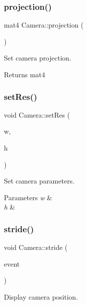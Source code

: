 \subsubsection{\texorpdfstring{projection()}{projection()}}
{\footnotesize\ttfamily mat4 Camera\+::projection (\begin{DoxyParamCaption}{ }\end{DoxyParamCaption})}



Set camera projection. 

\begin{DoxyReturn}{Returns}
mat4 
\end{DoxyReturn}
\mbox{\label{classCamera_aa14b536a20f27aff0b2041d9d5fbe56d}} 
\subsubsection{\texorpdfstring{setRes()}{setRes()}}
{\footnotesize\ttfamily void Camera\+::set\+Res (\begin{DoxyParamCaption}\item[{G\+Luint}]{w,  }\item[{G\+Luint}]{h }\end{DoxyParamCaption})}



Set camera parameters. 


\begin{DoxyParams}{Parameters}
{\em w} & \\
\hline
{\em h} & \\
\hline
\end{DoxyParams}
\mbox{\label{classCamera_a82f4dae580a39549995aa1e91394c1b8}} 
\subsubsection{\texorpdfstring{stride()}{stride()}}
{\footnotesize\ttfamily void Camera\+::stride (\begin{DoxyParamCaption}\item[{S\+D\+L\+\_\+\+Event \&}]{event }\end{DoxyParamCaption})}



Display camera position. 


